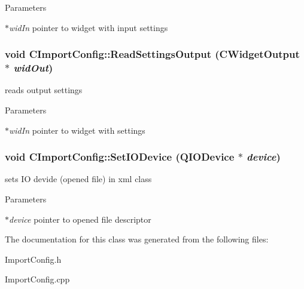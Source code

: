 \begin{DoxyParams}{Parameters}
\item[{\em $\ast$widIn}]pointer to widget with input settings \end{DoxyParams}
\hypertarget{classCImportConfig_a98422fe598b7ef8e64fd583133670566}{
\subsubsection[{ReadSettingsOutput}]{\setlength{\rightskip}{0pt plus 5cm}void CImportConfig::ReadSettingsOutput ({\bf CWidgetOutput} $\ast$ {\em widOut})}}
\label{classCImportConfig_a98422fe598b7ef8e64fd583133670566}
reads output settings


\begin{DoxyParams}{Parameters}
\item[{\em $\ast$widIn}]pointer to widget with settings \end{DoxyParams}
\hypertarget{classCImportConfig_a725b2dfb494c97728b6b53ef8b4d92e9}{
\subsubsection[{SetIODevice}]{\setlength{\rightskip}{0pt plus 5cm}void CImportConfig::SetIODevice (QIODevice $\ast$ {\em device})}}
\label{classCImportConfig_a725b2dfb494c97728b6b53ef8b4d92e9}
sets IO devide (opened file) in xml class


\begin{DoxyParams}{Parameters}
\item[{\em $\ast$device}]pointer to opened file descriptor \end{DoxyParams}


The documentation for this class was generated from the following files:\begin{DoxyCompactItemize}
\item 
ImportConfig.h\item 
ImportConfig.cpp\end{DoxyCompactItemize}
